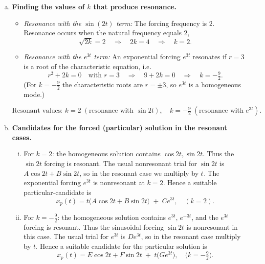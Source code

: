 \begin{example}
\begin{enumerate}[(a)]
    \item
    \textbf{Finding the values of \(k\) that produce resonance.}

    \begin{itemize}
      \item \emph{Resonance with the $\sin(2t)$ term:}  The forcing frequency is \(2\). Resonance occurs when the natural frequency equals \(2\),
      \[
      \sqrt{2k}=2 \quad\Longrightarrow\quad 2k=4 \quad\Longrightarrow\quad k=2.
      \]
      \item \emph{Resonance with the \(e^{3t}\) term:}  An exponential forcing \(e^{3t}\) resonates if \(r=3\) is a root of the characteristic equation, i.e.
      \[
      r^2+2k=0 \quad\text{with } r=3 \quad\Longrightarrow\quad 9+2k=0 \quad\Longrightarrow\quad k=-\tfrac{9}{2}.
      \]
      (For \(k=-\tfrac{9}{2}\) the characteristic roots are \(r=\pm3\), so \(e^{3t}\) is a homogeneous mode.)
    \end{itemize}

    \[
    \boxed{\text{Resonant values: } k=2 \;(\text{resonance with }\sin2t),\quad k=-\tfrac{9}{2} \; (\text{resonance with }e^{3t}).}
    \]

    \vspace{3mm}

    \item 
    \textbf{Candidates for the forced (particular) solution in the resonant cases.}

    \begin{enumerate}[(i)]
      \item For \(k=2\): the homogeneous solution contains \(\cos2t,\sin2t\). Thus the \(\sin2t\) forcing is resonant.
      The usual nonresonant trial for \(\sin2t\) is \(A\cos2t+B\sin2t\), so in the resonant case we multiply by \(t\).
      The exponential forcing \(e^{3t}\) is nonresonant at \(k=2\). Hence a suitable particular-candidate is
      \[
      \boxed{\,x_p(t)=t\big(A\cos 2t + B\sin 2t\big) \;+\; C e^{3t},\quad (k=2).\,}
      \]

      \item For \(k=-\tfrac{9}{2}\): the homogeneous solution contains \(e^{3t},\, e^{-3t}\), and the \(e^{3t}\) forcing is resonant.
      Thus the sinusoidal forcing \(\sin2t\) is nonresonant in this case.
      The usual trial for \(e^{3t}\) is \(D e^{3t}\), so in the resonant case multiply by \(t\). Hence a suitable candidate for the particular solution is
      \[
      \boxed{\,x_p(t)=E\cos 2t + F\sin 2t \;+\; t\big(G e^{3t}\big),\quad \big(k=-\tfrac{9}{2}\big).\,}
      \]
    \end{enumerate}
  \end{enumerate}
  \end{example}


